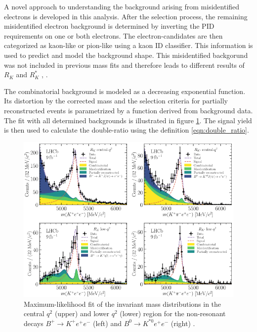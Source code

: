 A novel approach to understanding the background arising from misidentified 
electrons is developed in this analysis. After the selection process, the remaining 
misidentified electron background is determined by inverting the PID requirements 
on one or both electrons. The electron-candidates are then categorized as kaon-like or 
pion-like using a kaon ID classifier. This information is used to predict and model 
the background shape.
This misidentified backgorund was not included in previous mass fits and therefore
leads to different results of $R_K$ and $R_K^*$ \cite{previous_RK}, \cite{previous_RK*}.

The combinatorial background is modeled as a decreasing exponential function.
Its distortion by the corrected mass and the selection criteria for partially 
reconstructed events is parametrized by a function derived from background data.
The fit with all determined backgrounds is illustrated in figure \ref{fig:fits}.
The signal yield is then used to calculate the double-ratio using the definition
\eqref{eqn:double_ratio}.
\begin{figure}
    \centering
    \includegraphics[width=\linewidth]{figures/fits.png}
    \caption{Maximum-likelihood fit of the invariant mass distributions in the central $q^2$ (upper) and lower $q^2$ (lower) region for the non-resonant decays $B^+\to K^+e^+e^-$ (left) and $B^0\to K^{*0}e^+e^-$ (right) \cite{lhcbcollaboration2022test}.}
    \label{fig:fits}
\end{figure}

